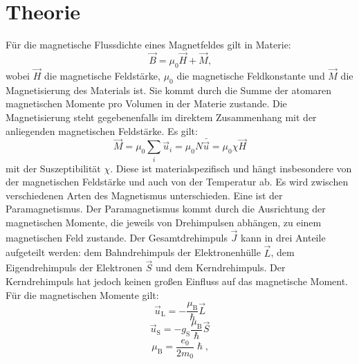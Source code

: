 
\section{Theorie}
\label{sec:Theorie}


Für die magnetische Flussdichte eines Magnetfeldes gilt in Materie:
\begin{equation}
\vec{B}=\mu_0 \vec{H}+\vec{M}\text{,}
\end{equation}
wobei $\vec{H}$ die magnetische Feldstärke, $\mu_0$ die magnetische Feldkonstante und $\vec{M}$ die Magnetisierung des Materials ist. Sie kommt durch die Summe der atomaren magnetischen Momente pro Volumen in der Materie zustande. Die Magnetisierung steht gegebenenfalls im direktem Zusammenhang mit der anliegenden magnetischen Feldstärke. Es gilt:
\begin{equation}
	\vec{M}=\mu_0 \sum\limits_{i} \vec{u}_i = \mu_0 N \bar{\vec{u}} =\mu_0 \chi \vec{H}
\end{equation}
mit der Suszeptibilität $\chi$. Diese ist materialspezifisch und hängt insbesondere von der magnetischen Feldstärke und auch von der Temperatur ab. Es wird zwischen verschiedenen Arten des Magnetismus unterschieden. Eine ist der Paramagnetismus. Der Paramagnetismus kommt durch die Ausrichtung der magnetischen Momente, die jeweils von Drehimpulsen abhängen, zu einem magnetischen Feld zustande. Der Gesamtdrehimpuls $\vec{J}$ kann in drei Anteile aufgeteilt werden: dem Bahndrehimpuls der Elektronenhülle $\vec{L}$, dem Eigendrehimpuls der Elektronen $\vec{S}$ und dem Kerndrehimpuls. Der Kerndrehimpuls hat jedoch keinen großen Einfluss auf das magnetische Moment. Für die magnetischen Momente gilt:
\begin{equation}
	\vec{u}_\text{L}=-\frac{\mu_\text{B}}{\hslash} \vec{L}
\end{equation}
\begin{equation}
	\vec{u}_\text{S}=-g_\text{S} \frac{\mu_\text{B}}{\hslash} \vec{S}
\end{equation}
\begin{equation}
	\mu_\text{B}=\frac{e_0}{2 m_0} \hslash \text{,}\label{eq:muB}
\end{equation}
